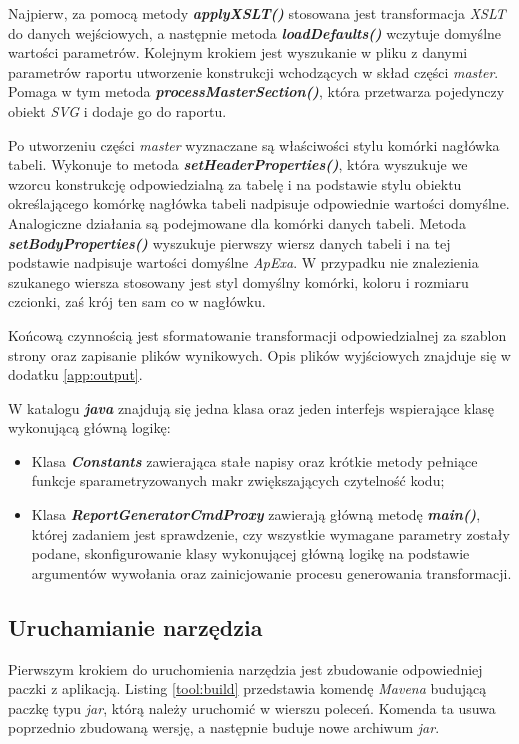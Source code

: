 \documentclass[11pt,a4paper]{article}
\begin{document}
Najpierw, za pomocą metody \emph{\textbf{applyXSLT()}} stosowana jest transformacja \emph{XSLT} do danych wejściowych, a następnie metoda \emph{\textbf{loadDefaults()}} wczytuje domyślne wartości parametrów. Kolejnym krokiem jest wyszukanie w pliku z danymi parametrów raportu utworzenie konstrukcji wchodzących w skład części \emph{master}. Pomaga w tym metoda \emph{\textbf{processMasterSection()}}, która przetwarza pojedynczy obiekt \emph{SVG} i dodaje go do raportu. 

Po utworzeniu części \emph{master} wyznaczane są właściwości stylu komórki nagłówka tabeli. Wykonuje to metoda \emph{\textbf{setHeaderProperties()}}, która wyszukuje we wzorcu konstrukcję odpowiedzialną za tabelę i na podstawie stylu obiektu określającego komórkę nagłówka tabeli nadpisuje odpowiednie wartości domyślne. Analogiczne działania są podejmowane dla komórki danych tabeli. Metoda \emph{\textbf{setBodyProperties()}} wyszukuje pierwszy wiersz danych tabeli i na tej podstawie nadpisuje wartości domyślne \emph{ApExa}. W przypadku nie znalezienia szukanego wiersza stosowany jest styl domyślny komórki, koloru i rozmiaru czcionki, zaś krój ten sam co w nagłówku. 

Końcową czynnością jest sformatowanie transformacji odpowiedzialnej za szablon strony oraz zapisanie plików wynikowych. Opis plików wyjściowych znajduje się w dodatku \ref{app:output}.

W katalogu \emph{\textbf{java}} znajdują się jedna klasa oraz jeden interfejs wspierające klasę wykonującą główną logikę:
\begin{itemize}
	\item Klasa \emph{\textbf{Constants}} zawierająca stałe napisy oraz krótkie metody pełniące funkcje sparametryzowanych makr zwiększających czytelność kodu;
	\item Klasa \emph{\textbf{ReportGeneratorCmdProxy}} zawierają główną metodę \emph{\textbf{main()}}, której zadaniem jest sprawdzenie, czy wszystkie wymagane parametry zostały podane, skonfigurowanie klasy wykonującej główną logikę na podstawie argumentów wywołania oraz zainicjowanie procesu generowania transformacji.
\end{itemize}

\subsection{Uruchamianie narzędzia}\label{tool:running}
Pierwszym krokiem do uruchomienia narzędzia jest zbudowanie odpowiedniej paczki z aplikacją. Listing \ref{tool:build} przedstawia komendę \emph{Mavena} budującą paczkę typu \emph{jar}, którą należy uruchomić w wierszu poleceń. Komenda ta usuwa poprzednio zbudowaną wersję, a następnie buduje nowe archiwum \emph{jar}.
\end{document}
